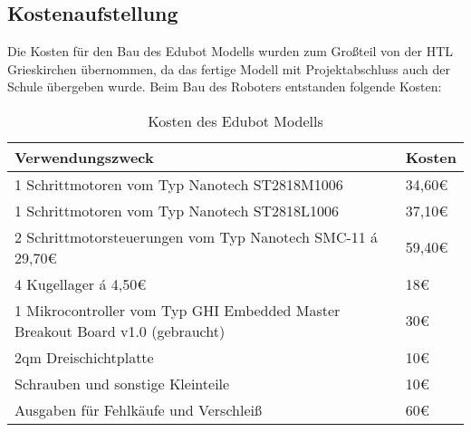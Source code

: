 \subsection{Kostenaufstellung}
Die Kosten für den Bau des Edubot Modells wurden zum Großteil von der HTL Grieskirchen übernommen, da das fertige Modell mit Projektabschluss auch der Schule übergeben wurde. Beim Bau des Roboters entstanden folgende Kosten:

\begin{table}[H]
\begin{tabular}{|p{11cm}|p{3cm}|}
\hline 
\textbf{Verwendungszweck} & \textbf{Kosten}\\
\hline
1 Schrittmotoren vom Typ Nanotech ST2818M1006 & 34,60\euro{}\\
\hline
1 Schrittmotoren vom Typ Nanotech ST2818L1006 & 37,10\euro{}\\
\hline
2 Schrittmotorsteuerungen vom Typ Nanotech SMC-11 á 29,70\euro{} & 59,40\euro{}\\
\hline
4 Kugellager á 4,50\euro{} & 18\euro{}\\
\hline
1 Mikrocontroller vom Typ GHI Embedded Master Breakout Board v1.0 (gebraucht) & 30\euro{}\\ 
\hline
2qm Dreischichtplatte & 10\euro{}\\ 
\hline
Schrauben und sonstige Kleinteile & 10\euro{}\\ 
\hline
Ausgaben für Fehlkäufe und Verschleiß & 60\euro{}\\ 
\hline
\end{tabular}
\caption{Kosten des Edubot Modells}
\end{table}
